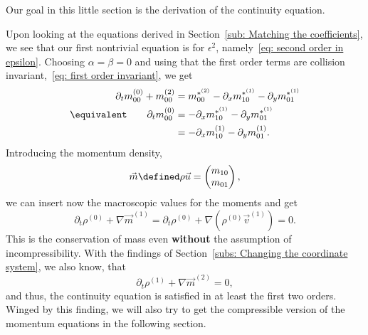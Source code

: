 Our goal in this little section is the derivation of the continuity equation.

Upon looking at the equations derived in Section~\ref{sub: Matching the coefficients}, we see that our first nontrivial equation is for $\epsilon^2$, namely~\eqref{eq: second order in epsilon}.
Choosing $\alpha=\beta=0$ and using that the first order terms are collision invariant,~\eqref{eq: first order invariant}, we get
\begin{equation}
    \begin{aligned}
      \partial_t m_{00}^{(0)} + m_{00}^{(2)} & =  m_{00}^{*^{(2)}} - \partial_x m_{10}^{*^{(1)}} - \partial_y m_{01}^{*^{(1)}} \\
      \equivalent \qquad \partial_t m_{00}^{(0)} & =  - \partial_x m_{10}^{*^{(1)}} - \partial_y m_{01}^{*^{(1)}} \\
      & =  - \partial_x m_{10}^{(1)} - \partial_y m_{01}^{(1)}.
    \end{aligned}
\end{equation}
Introducing the momentum density,
\begin{equation}
  \vec{m} \defined \rho \vec{u} = \begin{pmatrix}m_{10} \\m_{01}  \end{pmatrix},
\end{equation}
we can insert now the macroscopic values for the moments and get
\begin{equation}
  \partial_t \rho^{(0)} + \nabla \vec{m}^{(1)} =
  \partial_t \rho^{(0)} + \nabla (\rho^{(0)} \vec{v}^{(1)}) = 0.
\end{equation}
This is the conservation of mass even \textbf{without} the assumption of incompressibility.
With the findings of Section~\ref{subs: Changing the coordinate system}, we also know, that
\begin{equation}
  \partial_t \rho^{(1)} + \nabla \vec{m}^{(2)} = 0,
\end{equation}
and thus, the continuity equation is satisfied in at least the first two orders.
Winged by this finding, we will also try to get the compressible version of the momentum equations in the following section.
